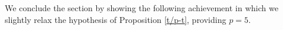 \documentclass[12pt]{article}
\newcommand{\cC}{{\mathcal C}}
\newcommand{\cM}{{\mathcal M}}
\DeclareMathOperator{\PG}{{PG}}
\DeclareMathOperator{\AG}{{AG}}
\begin{document}
	We conclude the section by showing the following achievement in which we slightly relax the hypothesis of Proposition \ref{t/p-t}, providing $p=5$. 
	
	
	
	
\end{document}
